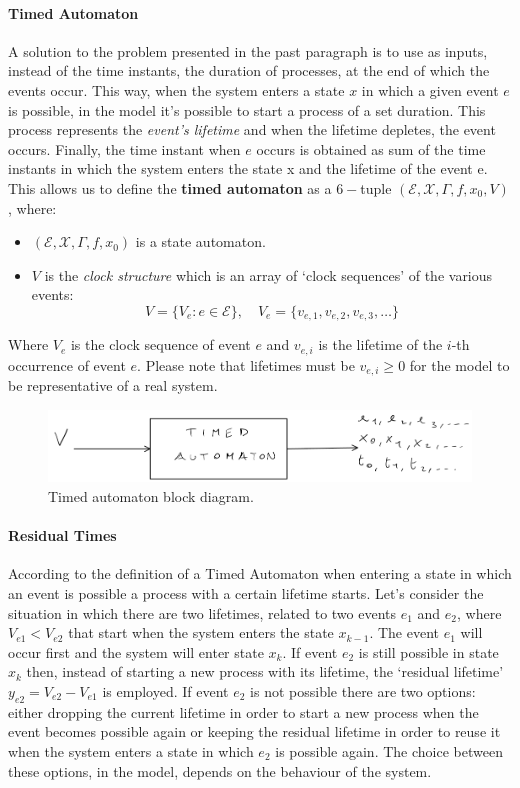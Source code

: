 \documentclass[12pt,a4paper]{article}
\begin{document}
\paragraph{Timed Automaton}
A solution to the problem presented in the past paragraph is to use as inputs, instead of the time instants, the duration of processes, at the end of which the events occur. This way, when the system enters a state $x$ in which a given event $e$ is possible, in the model it’s possible to start a process of a set duration. This process represents the \textit{event's lifetime} and when the lifetime depletes, the event occurs. Finally, the time instant when $e$ occurs is obtained as sum of the time instants in which the system enters the state x and the lifetime of the event e.
This allows us to define the \textbf{timed automaton} as a $6-$tuple $(\mathcal{E},\mathcal{X},\Gamma,f,x_0,V)$, where: 
\begin{itemize}
\item $(\mathcal{E},\mathcal{X},\Gamma,f,x_0)$ is a state automaton. 
\item $V$ is the \textit{clock structure} which is an array of `clock sequences’ of the various events:
$$
V=\{V_e : e\in\mathcal{E}\}, \quad V_e=\{v_{e,1}, v_{e,2}, v_{e,3},\dots\}
$$
\end{itemize}	
\noindent
Where $V_e$ is the clock sequence of event $e$ and $v_{e,i}$ is the lifetime of the $i$-th occurrence of event $e$. Please note that lifetimes must be $v_{e,i} \ge 0$ for the model to be representative of a real system.

\begin{figure}[H]
	\centering
	\includegraphics[width=\textwidth]{IMG/timedAut.png}
	\caption{Timed automaton block diagram.}
	\label{fig:timedAut}
\end{figure}

\paragraph{Residual Times} According to the definition of a Timed Automaton when entering a state in which an event is possible a process with a certain lifetime starts. Let’s consider the situation in which there are two lifetimes, related to two events $e_1$ and $e_2$, where $V_{e1}<V_{e2}$ that start when the system enters the state $x_{k-1}$. The event $e_1$ will occur first and the system will enter state $x_k$. If event $e_2$ is still possible in state $x_k$ then, instead of starting a new process with its lifetime, the `residual lifetime’ $y_{e2}=V_{e2}-V_{e1}$ is employed. If event $e_2$ is not possible there are two options: either dropping the current lifetime in order to start a new process when the event becomes possible again or keeping the residual lifetime in order to reuse it when the system enters a state in which $e_2$ is possible again. The choice between these options, in the model, depends on the behaviour of the system.
\end{document}
